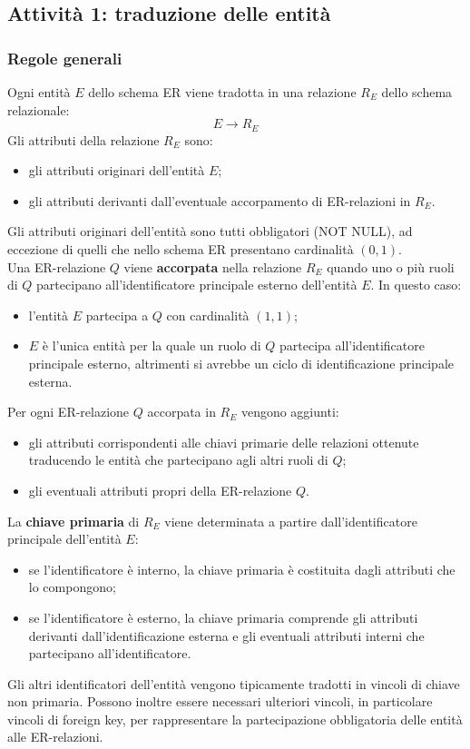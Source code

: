 \subsection{Attività 1: traduzione delle entità}
\subsubsection{Regole generali}
Ogni entità $E$ dello schema ER viene tradotta
in una relazione $R_E$ dello schema relazionale:
\[
E \longrightarrow R_E
\]
\noindent
Gli attributi della relazione $R_E$ sono:
\begin{itemize}
    \item gli attributi originari dell'entità $E$;

    \item gli attributi derivanti dall'eventuale
    accorpamento di ER-relazioni in $R_E$.
\end{itemize}
\noindent
Gli attributi originari dell'entità sono tutti
obbligatori (NOT NULL), ad eccezione di quelli
che nello schema ER presentano cardinalità
$(0,1)$.\medskip\\
\noindent
Una ER-relazione $Q$ viene \textbf{accorpata}
nella relazione $R_E$ quando uno o più ruoli
di $Q$ partecipano all'identificatore principale
esterno dell'entità $E$.
In questo caso:
\begin{itemize}
    \item l'entità $E$ partecipa a $Q$ con
    cardinalità $(1,1)$;

    \item $E$ è l'unica entità per la quale
    un ruolo di $Q$ partecipa all'identificatore
    principale esterno, altrimenti si avrebbe
    un ciclo di identificazione principale
    esterna.
\end{itemize}
\noindent
Per ogni ER-relazione $Q$ accorpata in $R_E$
vengono aggiunti:
\begin{itemize}
    \item gli attributi corrispondenti alle
    chiavi primarie delle relazioni ottenute
    traducendo le entità che partecipano
    agli altri ruoli di $Q$;

    \item gli eventuali attributi propri
    della ER-relazione $Q$.
\end{itemize}
\noindent
La \textbf{chiave primaria} di $R_E$ viene
determinata a partire dall'identificatore
principale dell'entità $E$:
\begin{itemize}
    \item se l'identificatore è interno,
    la chiave primaria è costituita dagli
    attributi che lo compongono;

    \item se l'identificatore è esterno,
    la chiave primaria comprende gli attributi
    derivanti dall'identificazione esterna
    e gli eventuali attributi interni che
    partecipano all'identificatore.
\end{itemize}
\noindent
Gli altri identificatori dell'entità vengono
tipicamente tradotti in vincoli di chiave
non primaria.
Possono inoltre essere necessari ulteriori
vincoli, in particolare vincoli di foreign key,
per rappresentare la partecipazione obbligatoria
delle entità alle ER-relazioni.

